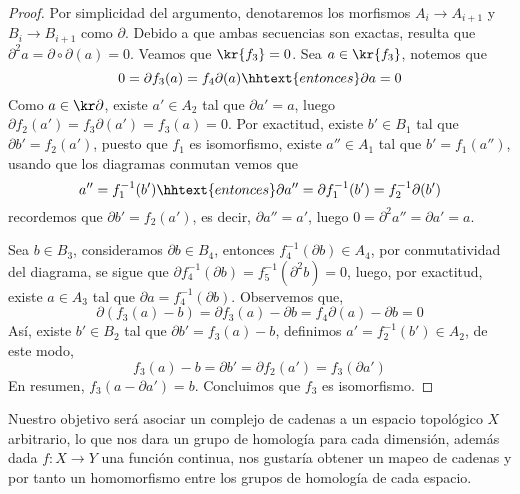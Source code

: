 \documentclass{article}
\begin{document}
\begin{proof}
    Por simplicidad del argumento, denotaremos los morfismos $A_{i}\to A_{i+1}$ y 
    $B_{i}\to B_{i+1}$ como $\partial$. Debido a que ambas secuencias son exactas, resulta que 
    $\partial^{2}a=\partial\circ\partial (a)=0$. Veamos que $\kr{f_{3}}=0$. Sea $a\in\kr{f_{3}}$,
    notemos que
    \begin{equation*}
        0=\partial f_{3}(a)=f_{4}\partial(a)\hhtext{entonces}\partial a=0
    \end{equation*}
    Como $a\in\kr\partial$, existe $a'\in A_{2}$ tal que $\partial a'=a$, luego 
    $\partial f_{2}(a')=f_{3}\partial(a')=f_{3}(a)=0$. Por exactitud, existe $b'\in B_{1}$ tal que 
    $\partial b'=f_{2}(a')$, puesto que $f_{1}$ es isomorfismo, existe $a''\in A_{1}$ tal que 
    $b'=f_{1}(a'')$, usando que los diagramas conmutan vemos que
    \begin{equation*}
        a''=f^{-1}_{1}(b')\hhtext{entonces}\partial a''=\partial f^{-1}_{1}(b')
        =f^{-1}_{2}\partial(b')
    \end{equation*}
    recordemos que $\partial b'=f_{2}(a')$, es decir, $\partial a''=a'$, luego 
    $0=\partial^{2}a''=\partial a'=a$.

    \vspace{2mm}
    \noindent Sea $b\in B_{3}$, consideramos $\partial b\in B_{4}$, entonces 
    $f^{-1}_{4}(\partial b)\in A_{4}$, por conmutatividad del diagrama, se sigue que
    $\partial f_{4}^{-1}(\partial b)=f_{5}^{-1}(\partial^{2}b)=0$, luego, por exactitud, existe
    $a\in A_{3}$ tal que $\partial a=f_{4}^{-1}(\partial b)$. Observemos que,
    \begin{equation*}
        \partial(f_{3}(a)-b)=\partial f_{3}(a)-\partial b=f_{4}\partial(a)-\partial b=0
    \end{equation*}
    Así, existe $b'\in B_{2}$ tal que $\partial b'=f_{3}(a)-b$, definimos 
    $a'=f_{2}^{-1}(b')\in A_{2}$, de este modo,
    \begin{equation*}
        f_{3}(a)-b=\partial b'=\partial f_{2}(a')=f_{3}(\partial a')
    \end{equation*}
    En resumen, $f_{3}(a-\partial a')=b$. Concluimos que $f_{3}$ es isomorfismo.
\end{proof}

\vspace{2mm}
\noindent Nuestro objetivo será asociar un complejo de cadenas a un espacio topológico $X$ 
arbitrario, lo que nos dara un grupo de homología para cada dimensión, además dada $f:X\to Y$ una
función continua, nos gustaría obtener un mapeo de cadenas y por tanto un homomorfismo entre los
grupos de homología de cada espacio.
\end{document}

